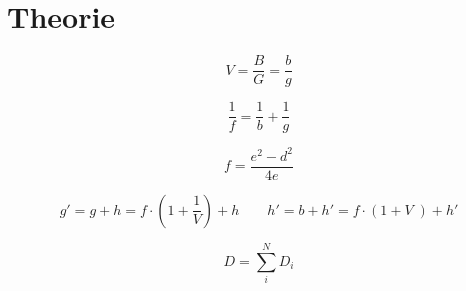 \section{Theorie}
\label{sec:Theorie}

\begin{equation}
  V = \frac{B}{G} = \frac{b}{g}
  \label{eqn:AG}
\end{equation}

\begin{equation}
  \frac{1}{f} = \frac{1}{b} + \frac{1}{g}
  \label{eqn:LG}
\end{equation}

\begin{equation}
  f = \frac{e^2 - d^2}{4e}
  \label{eqn:bessel}
\end{equation}

\begin{equation}
  g' = g + h = f \cdot \left( 1 + \frac{1}{V}\right) + h
  \qquad
  h' = b + h' = f \cdot \left( 1+ V \;\right) + h'
  \label{eqn:abbe}
\end{equation}

\begin{equation}
   D =  \sum_i ^N D_i
  \label{eqn:D}
\end{equation}
